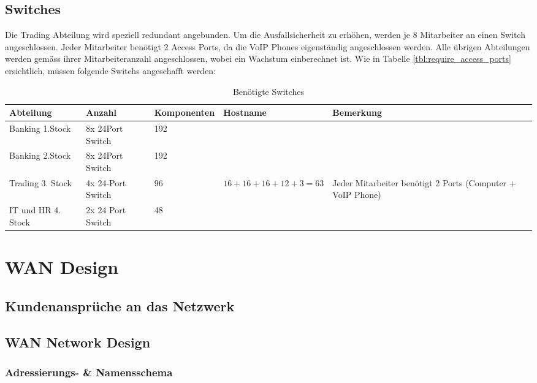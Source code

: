 \subsection{Switches}
Die Trading Abteilung wird speziell redundant angebunden. Um die Ausfallsicherheit zu erhöhen, werden je 8 Mitarbeiter an einen Switch angeschlossen. Jeder Mitarbeiter benötigt 2 Access Ports, da die VoIP Phones eigenständig angeschlossen werden. Alle übrigen Abteilungen werden gemäss ihrer Mitarbeiteranzahl angeschlossen, wobei ein Wachstum einberechnet ist. 
Wie in Tabelle \ref{tbl:require_access_ports} ersichtlich, müssen folgende Switchs angeschafft werden:
\begin{table}[h]
	\centering
	\begin{tabu} to \linewidth {l l l X X}
		\toprule 
		Abteilung & Anzahl & Komponenten & Hostname & Bemerkung \\
		\midrule
		Banking 1.Stock & 8x 24Port Switch & 192 &  & \\
		Banking 2.Stock & 8x 24Port Switch & 192 &  & \\
		Trading 3. Stock & 4x 24-Port Switch & 96 & $16 + 16 + 16 + 12 + 3 = 63$ & Jeder Mitarbeiter benötigt 2 Ports (Computer + VoIP Phone)\\
		IT und HR 4. Stock & 2x 24 Port Switch & 48 &  & \\
		\bottomrule 
	\end{tabu} 
	\caption{Benötigte Switches}
\end{table}

\section{WAN Design}

\subsection{Kundenansprüche an das Netzwerk}

\subsection{WAN Network Design}

\subsubsection{Adressierungs- \& Namensschema}

